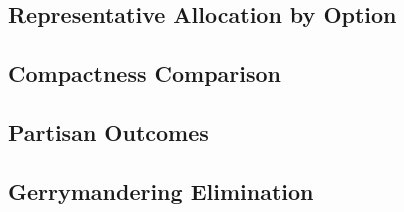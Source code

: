 
\subsection{Representative Allocation by Option}

\subsection{Compactness Comparison}

\subsection{Partisan Outcomes}

\subsection{Gerrymandering Elimination}
